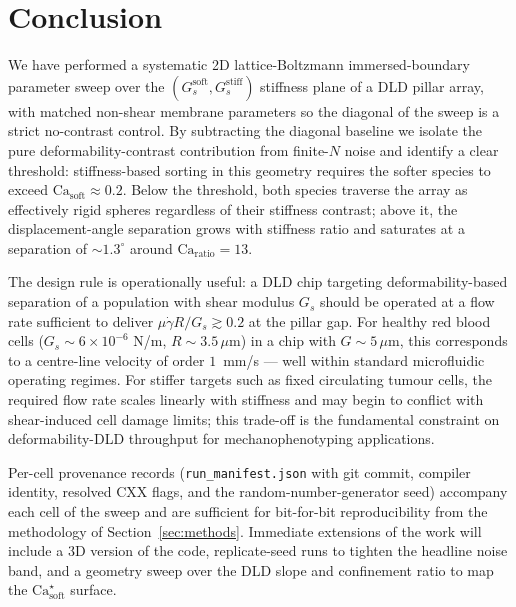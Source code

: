 \documentclass[11pt,a4paper]{article}
\begin{document}
\section{Conclusion}
\label{sec:conclusion}

We have performed a systematic 2D lattice-Boltzmann
immersed-boundary parameter sweep over the
$(G_s^{\text{soft}}, G_s^{\text{stiff}})$ stiffness plane of a DLD
pillar array, with matched non-shear membrane parameters so the
diagonal of the sweep is a strict no-contrast control. By
subtracting the diagonal baseline we isolate the pure
deformability-contrast contribution from finite-$N$ noise and
identify a clear threshold: stiffness-based sorting in this
geometry requires the softer species to exceed
$\mathrm{Ca}_{\text{soft}} \approx 0.2$. Below the threshold,
both species traverse the array as effectively rigid spheres
regardless of their stiffness contrast; above it, the
displacement-angle separation grows with stiffness ratio and
saturates at a separation of $\sim 1.3^\circ$ around
$\mathrm{Ca}_{\text{ratio}} = 13$.

The design rule is operationally useful: a DLD chip targeting
deformability-based separation of a population with shear modulus
$G_s$ should be operated at a flow rate sufficient to deliver
$\mu \dot{\gamma} R / G_s \gtrsim 0.2$ at the pillar gap.
For healthy red blood cells ($G_s \sim 6 \times 10^{-6}$ N/m,
$R \sim 3.5\,\mu$m) in a chip with $G \sim 5\,\mu$m, this
corresponds to a centre-line velocity of order $1$~mm/s --- well
within standard microfluidic operating regimes. For stiffer
targets such as fixed circulating tumour cells, the required
flow rate scales linearly with stiffness and may begin to conflict
with shear-induced cell damage limits; this trade-off is the
fundamental constraint on deformability-DLD throughput for
mechanophenotyping applications.

Per-cell provenance records (\verb|run_manifest.json| with git
commit, compiler identity, resolved CXX flags, and the
random-number-generator seed) accompany each cell of the sweep and
are sufficient for bit-for-bit reproducibility from the
methodology of Section~\ref{sec:methods}. Immediate extensions of
the work will include a 3D version of the code, replicate-seed
runs to tighten the headline noise band, and a geometry sweep
over the DLD slope and confinement ratio to map the
$\mathrm{Ca}_{\text{soft}}^\star$ surface.

\end{document}
